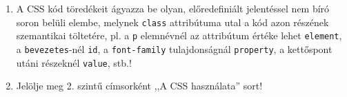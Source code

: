\begin{frame}
\begin{columns}[c]
\begin{enumerate}
        \item A CSS kód töredékeit ágyazza be olyan, előredefiniált jelentéssel nem bíró soron belüli elembe, melynek \texttt{class} attribútuma utal a kód azon részének szemantikai töltetére, pl. a \texttt{p} elemnévnél az attribútum értéke lehet \texttt{element}, a \texttt{bevezetes}-nél \texttt{id}, a \texttt{font-family} tulajdonságnál \texttt{property}, a kettőspont utáni részeknél \texttt{value}, stb.!
        \item Jelölje meg 2. szintű címsorként ,,A CSS használata'' sort!
        \setcounter{feladatSzamlalo}{\theenumi}
      \end{enumerate}
  \end{columns}
\end{frame}
